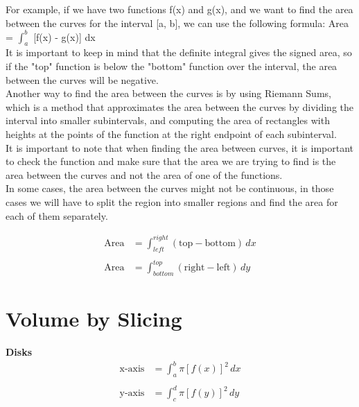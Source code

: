 For example, if we have two functions f(x) and g(x), and we want to find the 
area between the curves for the interval [a, b], we can use the following 
formula: Area = $\int_{a}^{b}$ [f(x) - g(x)] dx\\

It is important to keep in mind that the definite integral gives the signed 
area, so if the "top" function is below the "bottom" function over the interval, 
the area between the curves will be negative.\\

Another way to find the area between the curves is by using Riemann Sums, which 
is a method that approximates the area between the curves by dividing the 
interval into smaller subintervals, and computing the area of rectangles with 
heights at the points of the function at the right endpoint of each subinterval.\\

It is important to note that when finding the area between curves, it is 
important to check the function and make sure that the area we are trying to 
find is the area between the curves and not the area of one of the functions.\\

In some cases, the area between the curves might not be continuous, in those 
cases we will have to split the region into smaller regions and find the area 
for each of them separately.\\

\begin{framed}
  \begin{align*}
    \text{Area} &= \int_{left}^{right} (\text{top} - \text{bottom}) \, dx\\\\
    \text{Area} &= \int_{bottom}^{top} (\text{right} - \text{left}) \, dy
  \end{align*}
\end{framed}


\section{Volume by Slicing}

\begin{framed}
  \noindent \textbf{Disks}
  \begin{align*}
    \text{x-axis} &= \int_a^b \pi [f(x)]^2 \, dx\\\\
    \text{y-axis} &= \int_c^d \pi [f(y)]^2 \, dy
  \end{align*}
\end{framed}

